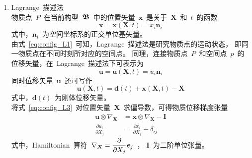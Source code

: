 \begin{enumerate}
\item Lagrange~描述法\\
物质点~$P$~在当前构型~$\bm{\mathfrak{B}}$~中的位置矢量~$\bm{x}$~是关于~$\bm{X}$~和~$t$~的函数
\begin{equation}\label{eq:config_L1}
	\bm{x}=\bm{x}(\bm{X},t)=x_i\bm{n}_i
\end{equation}
式中，$\bm{n}_i$~为空间坐标系的正交单位基矢量。\\
由式~\eqref{eq:config_L1}~可知，Lagrange~描述法是研究物质点的运动状态，
即同一物质点在不同时刻所对应的空间点。
同理，连接物质点~$P$~和空间点~$p$~的位移矢量，在~Lagrange~描述法下可表示为
\begin{equation}\label{eq:config_L2}
	\bm{u}=\bm{u}(\bm{X},t)=u_i\bm{n}_i
\end{equation}
同时位移矢量~$\bm{u}$~还可写作
\begin{equation}\label{eq:config_L3}
	\bm{u}(\bm{X},t)=\bm{d}(t)+\bm{x}(\bm{X},t)-\bm{X}
\end{equation}
式中，$\bm{d}(t)$~为刚体位移矢量。\\
将式~\eqref{eq:config_L3}~对位置矢量~$\bm{X}$~求偏导数，可得物质位移梯度张量
{\setlength\belowdisplayskip{5pt}
\begin{subequations}\label{eq:config_L4}
	\begin{align}
	\bm{u} \otimes \nabla_{\bm{X}} & =\bm{x} \otimes \nabla_{\bm{X}}-\bm{I} \label{eq:config_L4a} \\[1pt]
	\frac{\partial u_i}{\partial X_j} & =\frac{\partial x_i}{\partial X_j}-\delta_{ij} \label{eq:config_L4b}
	\end{align}
\end{subequations}}
式中，Hamiltonian~算符~$\nabla_{\bm{X}}={\displaystyle\frac{\partial}{\partial X_j}} \bm{e}_j$~，
$\bm{I}$~为二阶单位张量。


\end{enumerate}
